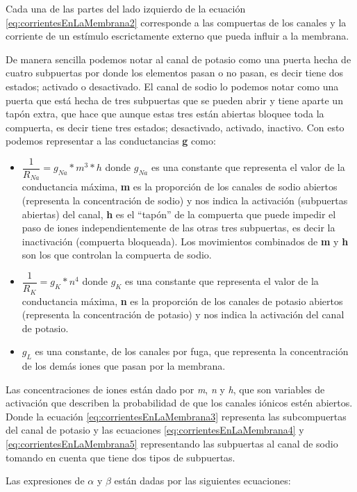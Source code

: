 Cada una de las partes del lado izquierdo de la ecuación \ref{eq:corrientesEnLaMembrana2} corresponde a las compuertas de los canales y la corriente de un estímulo escrictamente externo que pueda influir a la membrana.

De manera sencilla podemos notar al canal de potasio como una puerta hecha de cuatro subpuertas por donde los elementos pasan o no pasan, es decir tiene dos estados; activado o desactivado. El canal de sodio lo podemos notar como una puerta que está hecha de tres subpuertas que se pueden abrir y tiene aparte un tapón extra, que hace que aunque estas tres están abiertas bloquee toda la compuerta, es decir tiene tres estados; desactivado, activado, inactivo. Con esto podemos representar a las conductancias \textbf{g} como:

\begin{itemize}
 \item \(\dfrac{1}{R_{Na}} = g_{Na} * m ^3 * h \) donde \(g_{Na}\) es una constante que representa el valor de la conductancia máxima, \textbf{m} es la proporción de los canales de sodio abiertos (representa la concentración de sodio) y nos indica la activación (subpuertas abiertas) del canal, \textbf{h} es el “tapón” de la compuerta que puede impedir el paso de iones independientemente de las otras tres subpuertas, es decir la inactivación (compuerta bloqueada).
Los movimientos combinados de \textbf{m} y \textbf{h} son los que controlan la compuerta de sodio.
 \item \(\dfrac{1}{R_{K}} = g_{K} * n^4\) donde \(g_{K}\) es una constante que representa el valor de la conductancia máxima, \textbf{n} es la proporción de los canales de potasio abiertos (representa la concentración de potasio) y nos indica la activación del canal de potasio.
 \item \(g_{L}\) es una constante, de los canales por fuga, que representa la concentración de los demás iones que pasan por la membrana.
\end{itemize}

Las concentraciones de iones están dado por \emph{m}, \emph{n} y \emph{h}, que son variables de activación que describen la probabilidad de que los canales iónicos estén abiertos. Donde la ecuación \ref{eq:corrientesEnLaMembrana3} representa las subcompuertas del canal de potasio y las ecuaciones \ref{eq:corrientesEnLaMembrana4} y \ref{eq:corrientesEnLaMembrana5} representando las subpuertas al canal de sodio tomando en cuenta que tiene dos tipos de subpuertas.

Las expresiones de \(\alpha\) y \(\beta\) están dadas por las siguientes ecuaciones:

